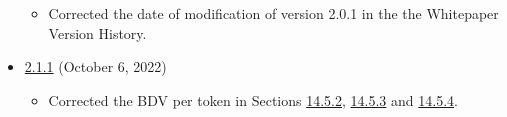 \documentclass[class=article, crop=false]{standalone}
\begin{document}
\begin{itemize}[topsep=0pt, itemsep=3pt,leftmargin=16pt]
\begin{itemize}
        \item Corrected the date of modification of version 2.0.1 in the the Whitepaper Version History.
    \end{itemize}  
        \item \href{https://github.com/BeanstalkFarms/Beanstalk/blob/master/beanstalk.pdf}{2.1.1} (October 6, 2022)
    \begin{itemize}
        \item Corrected the BDV per token in Sections \hyperlink{subsubsection.14.5.2}{14.5.2}, \hyperlink{subsubsection.14.5.3}{14.5.3} and \hyperlink{subsubsection.14.5.4}{14.5.4}.
    \end{itemize}  
\end{itemize}
\end{document}

